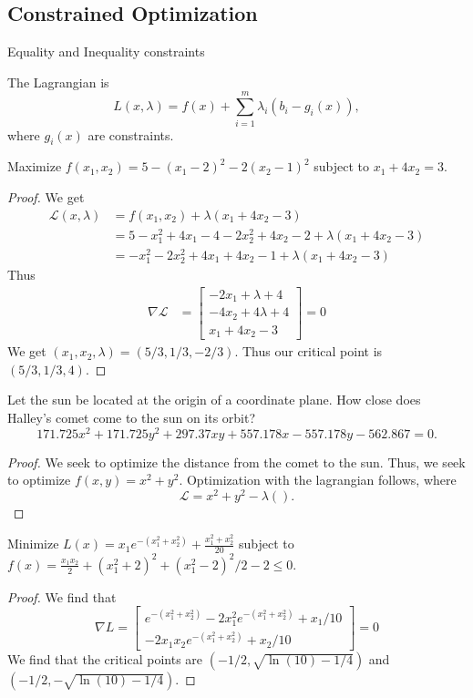 \documentclass[11pt,twoside=semi,openright,numbers=noenddot]{scrbook}
\begin{document}
\subsection{Constrained Optimization}
Equality and Inequality constraints
\begin{definition}
    The \alert{Lagrangian} is
    $$L(x,\lambda) = f(x) + \sum_{i=1}^{m} \lambda_i (b_i-g_i(x)),$$
    where $g_i(x)$ are constraints. 
\end{definition}
\begin{example}
    Maximize $f(x_1,x_2)=5-(x_1-2)^2-2(x_2-1)^2$ subject to $x_1+4x_2=3$. 
\end{example}
\begin{proof}
    We get
    \begin{align*}
        \mathcal{L}(x,\lambda) &= f(x_1,x_2) +\lambda(x_1+4x_2-3) \\
          &= 5-x_1^2+4x_1-4-2x_2^2+4x_2-2 +\lambda(x_1+4x_2-3)\\
          &=-x_1^2-2x_2^2+4x_1+4x_2-1+\lambda(x_1+4x_2-3)
    \end{align*}
    Thus
    \begin{align*}
        \nabla \mathcal{L} &= \begin{bmatrix} -2x_1+\lambda+4 \\ -4x_2+4\lambda+4 \\ x_1+4x_2-3\end{bmatrix}=0
    \end{align*}
    We get $(x_1,x_2,\lambda) = (5/3, 1/3,-2/3)$. Thus our critical point is
    $\boxed{(5/3, 1/3, 4)}.$
\end{proof}
\begin{example}
    Let the sun be located at the origin of a coordinate plane. How close
    does Halley's comet come to the sun on its orbit?
    $$171.725x^2+171.725y^2+297.37xy+557.178x-557.178y-562.867=0.$$
\end{example}
\begin{proof}
    We seek to optimize the distance from the comet to the sun. Thus,
    we seek to optimize $f(x,y)=x^2+y^2$. Optimization with the lagrangian
    follows, where
    $$\mathcal{L} = x^2+y^2-\lambda().$$
\end{proof}
\begin{example}
    Minimize $L(x)=x_1e^{-(x_1^2+x_2^2)}+\frac{x_1^2+x_2^2}{20}$ subject to 
    $f(x) = \frac{x_1x_2}{2}+(x_1^2+2)^2+(x_1^2-2)^2/2-2\leq 0$.
\end{example}
\begin{proof}
    We find that
    $$\nabla L = 
    \begin{bmatrix} e^{-(x_1^2+x_2^2)}-2x_1^2e^{-(x_1^2+x_2^2)} +x_1/10\\ 
    -2x_1x_2e^{-(x_1^2+x_2^2)}+x_2/10 \end{bmatrix}=0$$
    We find that the critical points are $(-1/2,\sqrt{\ln(10)-1/4})$ and
    $(-1/2,-\sqrt{\ln(10)-1/4})$.
\end{proof}
\end{document}
